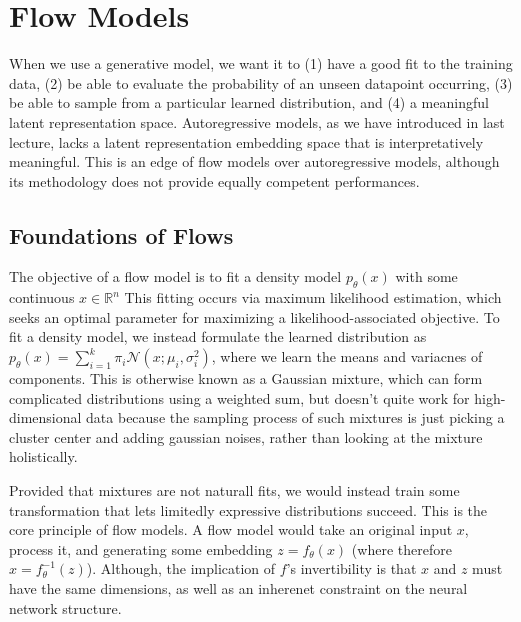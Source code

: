 \chapter{Flow Models}
When we use a generative model, we want it to (1) have a good fit to the training data, (2) be able to evaluate the probability of an unseen datapoint occurring, (3) be able to sample from a particular learned distribution, and (4) a meaningful latent representation space.
Autoregressive models, as we have introduced in last lecture, lacks a latent representation embedding space that is interpretatively meaningful.
This is an edge of flow models over autoregressive models, although its methodology does not provide equally competent performances. 

\section{Foundations of Flows}
The objective of a flow model is to fit a density model $p_\theta(x)$ with some continuous $x \in \mathbb{R}^n$
This fitting occurs via maximum likelihood estimation, which seeks an optimal parameter for maximizing a likelihood-associated objective.
To fit a density model, we instead formulate the learned distribution as $p_\theta (x) = \sum_{i=1}^k \pi_i \mathcal{N} (x; \mu_i, \sigma_i^2)$, where we learn the means and variacnes of components.
This is otherwise known as a Gaussian mixture, which can form complicated distributions using a weighted sum, but doesn't quite work for high-dimensional data because the sampling process of such mixtures is just picking a cluster center and adding gaussian noises, rather than looking at the mixture holistically.

Provided that mixtures are not naturall fits, we would instead train some transformation that lets limitedly expressive distributions succeed.
This is the core principle of flow models.
A flow model would take an original input $x$, process it, and generating some embedding $z = f_\theta (x)$ (where therefore $x = f_\theta^{-1} (z)$).
Although, the implication of $f$'s invertibility is that $x$ and $z$ must have the same dimensions, as well as an inherenet constraint on the neural network structure.


